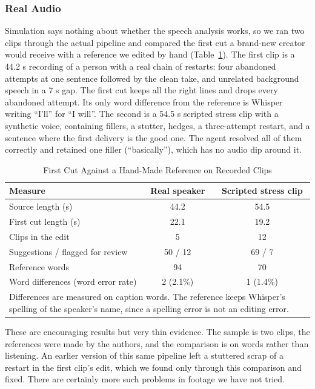 \documentclass{ieeeaccess}
\begin{document}
\subsubsection{Real Audio}
Simulation says nothing about whether the speech analysis works, so we ran two clips through the actual pipeline and compared the first cut a brand-new creator would receive with a reference we edited by hand (Table~\ref{tab:real}). The first clip is a 44.2 s recording of a person with a real chain of restarts: four abandoned attempts at one sentence followed by the clean take, and unrelated background speech in a 7 s gap. The first cut keeps all the right lines and drops every abandoned attempt. Its only word difference from the reference is Whisper writing ``I'll'' for ``I will''. The second is a 54.5 s scripted stress clip with a synthetic voice, containing fillers, a stutter, hedges, a three-attempt restart, and a sentence where the first delivery is the good one. The agent resolved all of them correctly and retained one filler (``basically''), which has no audio dip around it.

\begin{table}[t]
\caption{First Cut Against a Hand-Made Reference on Recorded Clips}
\label{tab:real}
\setlength{\tabcolsep}{3pt}
\centering
\begin{tabular}{|p{37mm}|c|c|}
\hline
Measure & Real speaker & Scripted stress clip \\
\hline
Source length (s) & 44.2 & 54.5 \\
First cut length (s) & 22.1 & 19.2 \\
Clips in the edit & 5 & 12 \\
Suggestions / flagged for review & 50 / 12 & 69 / 7 \\
Reference words & 94 & 70 \\
Word differences (word error rate) & 2 (2.1\%) & 1 (1.4\%) \\
\hline
\multicolumn{3}{p{80mm}}{Differences are measured on caption words. The reference keeps Whisper's spelling of the speaker's name, since a spelling error is not an editing error.}
\end{tabular}
\end{table}

These are encouraging results but very thin evidence. The sample is two clips, the references were made by the authors, and the comparison is on words rather than listening. An earlier version of this same pipeline left a stuttered scrap of a restart in the first clip's edit, which we found only through this comparison and fixed. There are certainly more such problems in footage we have not tried.
\end{document}
